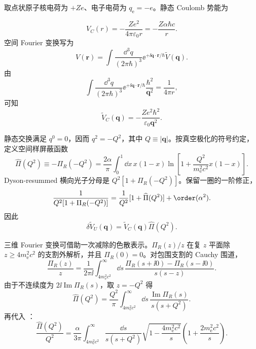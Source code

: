 \begin{derivation}
取点状原子核电荷为 $+Ze$、电子电荷为 $q_{\mathrm e}=-e$。静态 Coulomb 势能为

\begin{equation*}
 V_C(r)=-\frac{Ze^2}{4\pi\varepsilon_0r}
 =-\frac{Z\alpha\hbar c}{r}.
 \end{equation*}
空间 Fourier 变换写为
\begin{equation*}
 V(\mathbf r)
 =\int\frac{\dd^3 q}{(2\pi\hbar)^3}
 \ee^{+\ii\mathbf q\cdot\mathbf r/\hbar}
 \widetilde V(\mathbf q).
 \end{equation*}
由
\begin{equation*}
 \int\frac{\dd^3 q}{(2\pi\hbar)^3}
 \ee^{+\ii\mathbf q\cdot\mathbf r/\hbar}
 \frac{\hbar^2}{\mathbf q^2}
 =\frac1{4\pi r},
\end{equation*}
可知
\begin{equation*}
 \widetilde V_C(\mathbf q)
 =-\frac{Ze^2\hbar^2}{\varepsilon_0\mathbf q^2}.
 \end{equation*}

静态交换满足 $q^0=0$，因而 $q^2=-Q^2$，其中 $Q\equiv|\mathbf q|$。按真空极化的符号约定，定义空间样屏蔽函数
\begin{equation*}
 \widehat\Pi(Q^2)
 \equiv-\Pi_R(-Q^2)
 =\frac{2\alpha}{\pi}
 \int_0^1\dd x\,x(1-x)
 \ln\left[1+\frac{Q^2}{m_{\mathrm e}^2c^2}x(1-x)\right].
 \end{equation*}
Dyson-resummed 横向光子分母是 $Q^2[1+\Pi_R(-Q^2)]$。保留一圈的一阶修正，
\begin{equation*}
 \frac1{Q^2[1+\Pi_R(-Q^2)]}
 =\frac1{Q^2}[1+\widehat\Pi(Q^2)]+
 \order(\alpha^2).
\end{equation*}
因此
\begin{equation*}
 \delta\widetilde V_U(\mathbf q)
 =\widetilde V_C(\mathbf q)\widehat\Pi(Q^2).
 \end{equation*}

三维 Fourier 变换可借助一次减除的色散表示。$\Pi_R(z)/z$ 在复 $z$ 平面除 $z\ge4m_{\mathrm e}^2c^2$ 的支割外解析，并且 $\Pi_R(0)=0$。对包围支割的 Cauchy 围道，
\begin{equation*}
 \frac{\Pi_R(z)}{z}
 =\frac1{2\pi\ii}
 \int_{4m_{\mathrm e}^2c^2}^{\infty}\dd s\,
 \frac{\Pi_R(s+\ii0)-\Pi_R(s-\ii0)}{s(s-z)}.
\end{equation*}
由于不连续度为 $2\ii\operatorname{Im}\Pi_R(s)$，取 $z=-Q^2$ 得
\begin{equation*}
 \widehat\Pi(Q^2)
 =\frac{Q^2}{\pi}
 \int_{4m_{\mathrm e}^2c^2}^{\infty}\dd s\,
 \frac{\operatorname{Im}\Pi_R(s)}{s(s+Q^2)}.
 \end{equation*}
再代入 ：
\begin{equation*}
 \frac{\widehat\Pi(Q^2)}{Q^2}
 =\frac{\alpha}{3\pi}
 \int_{4m_{\mathrm e}^2c^2}^{\infty}\frac{\dd s}{s(s+Q^2)}
 \sqrt{1-\frac{4m_{\mathrm e}^2c^2}{s}}
 \left(1+\frac{2m_{\mathrm e}^2c^2}{s}\right).
 \end{equation*}


\end{derivation}
